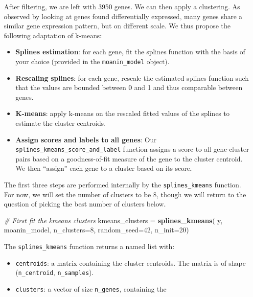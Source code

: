 \documentclass[9pt,a4paper,]{extarticle}
\newenvironment{Shaded}{\begin{snugshade}}{\end{snugshade}}
\newcommand{\CommentTok}[1]{\textcolor[rgb]{0.56,0.35,0.01}{\textit{#1}}}
\newcommand{\DataTypeTok}[1]{\textcolor[rgb]{0.13,0.29,0.53}{#1}}
\newcommand{\DecValTok}[1]{\textcolor[rgb]{0.00,0.00,0.81}{#1}}
\newcommand{\KeywordTok}[1]{\textcolor[rgb]{0.13,0.29,0.53}{\textbf{#1}}}
\newcommand{\NormalTok}[1]{#1}
\newcommand{\StringTok}[1]{\textcolor[rgb]{0.31,0.60,0.02}{#1}}
\begin{document}
After filtering, we are left with 3950 genes. We can then apply a
clustering. As observed by looking at genes found differentially expressed,
many genes share a similar gene expression pattern, but on different scale.
We thus propose the following adaptation of k-means:

\begin{itemize}
\tightlist
\item
  \textbf{Splines estimation}: for each gene, fit the splines function with the basis
  of your choice (provided in the \texttt{moanin\_model} object).
\item
  \textbf{Rescaling splines}: for each gene, rescale the estimated splines function
  such that the values are bounded between 0 and 1 and thus comparable between genes.
\item
  \textbf{K-means}: apply k-means on the rescaled fitted values of the splines to estimate the
  cluster centroids.
\item
  \textbf{Assign scores and labels to all genes}: Our
  \texttt{splines\_kmeans\_score\_and\_label} function assigns a score to all
  gene-cluster pairs based on a goodness-of-fit measure of the gene to the
  cluster centroid. We then ``assign'' each gene to a cluster based on its
  score.
\end{itemize}

The first three steps are performed internally by the \texttt{splines\_kmeans}
function. For now, we will set the number of clusters to be \(8\), though we
will return to the question of picking the best number of clusters below.

\begin{Shaded}
\begin{Highlighting}[]
\CommentTok{# First fit the kmeans clusters}
\NormalTok{kmeans_clusters =}\StringTok{ }\KeywordTok{splines_kmeans}\NormalTok{(}
\NormalTok{    y, moanin_model, }\DataTypeTok{n_clusters=}\DecValTok{8}\NormalTok{,}
    \DataTypeTok{random_seed=}\DecValTok{42}\NormalTok{,}
    \DataTypeTok{n_init=}\DecValTok{20}\NormalTok{)}
\end{Highlighting}
\end{Shaded}

The \texttt{splines\_kmeans} function returns a named list with:

\begin{itemize}
\tightlist
\item
  \texttt{centroids}: a matrix containing the cluster centroids. The matrix is of
  shape (\texttt{n\_centroid}, \texttt{n\_samples}).
\item
  \texttt{clusters}: a vector of size \texttt{n\_genes}, containing the
\end{itemize}
\end{document}
